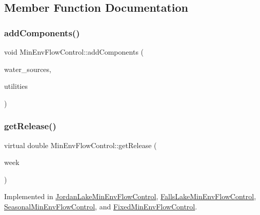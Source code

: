 \subsection{Member Function Documentation}
\mbox{\label{classMinEnvFlowControl_a4f849e1385f68c9d8f2835889f14a71f}} 
\subsubsection{\texorpdfstring{add\+Components()}{addComponents()}}
{\footnotesize\ttfamily void Min\+Env\+Flow\+Control\+::add\+Components (\begin{DoxyParamCaption}\item[{vector$<$ \mbox{\hyperlink{classWaterSource}{Water\+Source}} $\ast$$>$}]{water\+\_\+sources,  }\item[{vector$<$ \mbox{\hyperlink{classUtility}{Utility}} $\ast$$>$}]{utilities }\end{DoxyParamCaption})}

\mbox{\label{classMinEnvFlowControl_a5de79615852eb0c937dd559a9eb9402d}} 
\subsubsection{\texorpdfstring{get\+Release()}{getRelease()}}
{\footnotesize\ttfamily virtual double Min\+Env\+Flow\+Control\+::get\+Release (\begin{DoxyParamCaption}\item[{int}]{week }\end{DoxyParamCaption})\hspace{0.3cm}{\ttfamily [pure virtual]}}



Implemented in \mbox{\hyperlink{classJordanLakeMinEnvFlowControl_a5c2456c26fa141824c247cd15bf5c57d}{Jordan\+Lake\+Min\+Env\+Flow\+Control}}, \mbox{\hyperlink{classFallsLakeMinEnvFlowControl_a50453b443fb6e5869fcfc9a183f42b2f}{Falls\+Lake\+Min\+Env\+Flow\+Control}}, \mbox{\hyperlink{classSeasonalMinEnvFlowControl_a5c5ddcab367812bdd2e23b383449d202}{Seasonal\+Min\+Env\+Flow\+Control}}, and \mbox{\hyperlink{classFixedMinEnvFlowControl_af3ef98eef6a7124738a3b54dcadf757f}{Fixed\+Min\+Env\+Flow\+Control}}.


